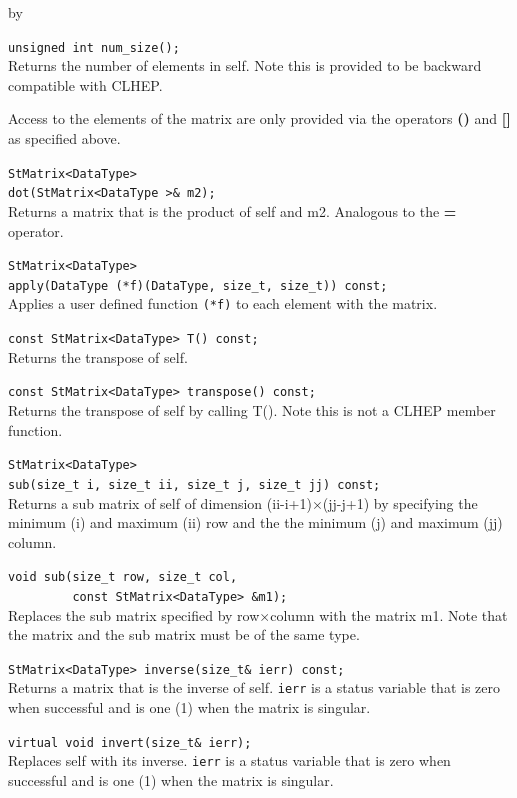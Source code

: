 \documentclass[twoside]{article}
\newcommand{\comp}[1]{\texttt{#1}}%
\newcommand{\entrylabel}[1]{\mbox{\textbf{{#1}}}\hfil}%
\newenvironment{entry}
{\begin{list}{}%
    {\renewcommand{\makelabel}{\entrylabel}%
     \setlength{\labelwidth}{90pt}%
     \setlength{\leftmargin}{\labelwidth}
     \advance\leftmargin by \labelsep%
      }%
    }%
  {\end{list}}
\newcommand{\Entrylabel}[1]%
{\raisebox{0pt}[1ex][0pt]{\makebox[\labelwidth][l]%
    {\parbox[t]{\labelwidth}{\hspace{0pt}\textbf{{#1}}}}}}
\newenvironment{Entry}%
{\renewcommand{\entrylabel}{\Entrylabel}\begin{entry}}%
  {\end{entry}}
\begin{document}
\begin{description}
\begin{Entry}
  \verb+unsigned int num_size();+\\
  Returns the number of elements in self.  Note this is
  provided to be backward compatible with CLHEP.

  Access to the elements of the matrix are only provided
  via the operators {\bf ()} and {\bf []} as specified above.  

  \verb+StMatrix<DataType>+\\
  \verb+dot(StMatrix<DataType >& m2);+\\
  Returns a matrix that is the product of self and m2.  Analogous to
  the {\bf *=} operator.
  
  \verb+StMatrix<DataType>+\\
  \verb+apply(DataType (*f)(DataType, size_t, size_t)) const;+\\
  Applies a user defined function \comp{(*f)} to each element with the
  matrix.
  
  \verb+const StMatrix<DataType> T() const;+\\
  Returns the transpose of self.

  \verb+const StMatrix<DataType> transpose() const;+\\
  Returns the transpose of self by calling T().  Note this
  is not a CLHEP member function.

  \verb+StMatrix<DataType>+\\
  \verb+sub(size_t i, size_t ii, size_t j, size_t jj) const;+\\
  Returns a sub matrix of self of dimension (ii-i+1)$\times$(jj-j+1) by
  specifying the minimum (i) and maximum (ii) row and the the minimum (j)
  and maximum (jj) column.

  \verb+void sub(size_t row, size_t col,+\\
  \verb+         const StMatrix<DataType> &m1);+\\
  Replaces the sub matrix specified by row$\times$column with
  the matrix m1.  Note that the matrix and the sub matrix must
  be of the same type.
  
  \verb+StMatrix<DataType> inverse(size_t& ierr) const;+\\
  Returns a matrix that is the inverse of self.  \comp{ierr}
  is a status variable that is zero when successful and is
  one (1) when the matrix is singular.
    
  \verb+virtual void invert(size_t& ierr);+\\
  Replaces self with its inverse.  \comp{ierr}
  is a status variable that is zero when successful and is
  one (1) when the matrix is singular.


\end{Entry}
\end{description}
\end{document}

